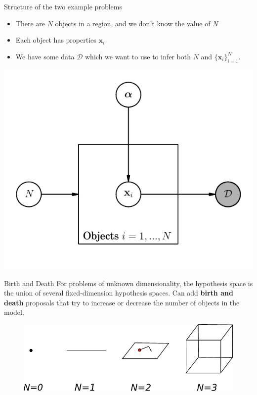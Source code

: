 \begin{frame}[t]{Structure of the two example problems}
  \begin{itemize}
  \setlength{\itemsep}{10pt}
  \item There are $N$ objects in a region, and we don't know the value of $N$
  \item Each object has properties $\mathbf{x}_i$
  \item We have some data $\mathcal{D}$ which we want to use to infer both $N$
        and $\{\mathbf{x}_i\}_{i=1}^N$.
  \end{itemize}
\begin{center}
\includegraphics[scale=0.5]{../Paper/pgm.pdf}
\end{center}
\end{frame}



\begin{frame}[t]{Birth and Death}
For problems of unknown dimensionality, the hypothesis space is the union
of several fixed-dimension hypothesis spaces. Can add {\bf birth and death}
proposals that try to increase or decrease the number of objects in the model.

\begin{figure}
\begin{center}
\includegraphics[scale=0.7]{drawing.pdf}
\end{center}
\end{figure}
\end{frame}

